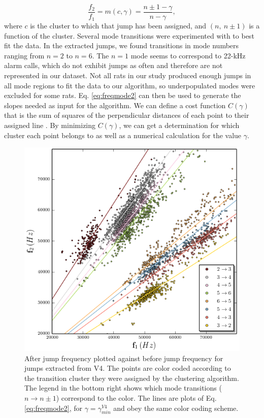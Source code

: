 \documentclass[superscriptaddress, twocolumn, prl]{revtex4}
\begin{document}
\begin{equation}
\label{eq:freqmode2}
\frac{f_{2}}{f_{1}}=m(c,\gamma)=\frac{n\pm1-\gamma}{n-\gamma},
\end{equation}where $c$ is the cluster to which that jump has been assigned, and $\left(n,\: n\pm1\right)$ is a function of the cluster. Several mode transitions were experimented with to best fit the data. In the extracted jumps, we found transitions in mode numbers ranging from $n=2$ to $n=6$. The $n=1$ mode seems to correspond to 22-kHz alarm calls, which do not exhibit jumps as often and therefore are not represented in our dataset. Not all rats in our study produced enough jumps in all mode regions to fit the data to our algorithm, so underpopulated modes were excluded for some rats. Eq. \ref{eq:freqmode2} can then be used to generate the slopes needed as input for the algorithm. We can define a cost function $C\left(\gamma \right)$ that is the sum of squares of the perpendicular distances of each point to their assigned line \cite{jump_appendix}. By minimizing $C\left(\gamma \right)$, we can get a determination for which cluster each point belongs to as well as a numerical calculation for the value $\gamma$. 
\begin{figure}[!ht]
\centering
\includegraphics[width=\columnwidth]{V4.png}
\caption{\label{fig:jumps}After jump frequency plotted against before jump frequency for jumps extracted from V4. The points are color coded according to the transition cluster they were assigned by the clustering algorithm. The legend in the bottom right shows which mode transitions ($n\rightarrow n\pm1$) correspond to the color. The lines are plots of Eq. \ref{eq:freqmode2}, for $\gamma=\gamma_{min}^{V4}$ and obey the same color coding scheme.} 
\end{figure}
\end{document}
